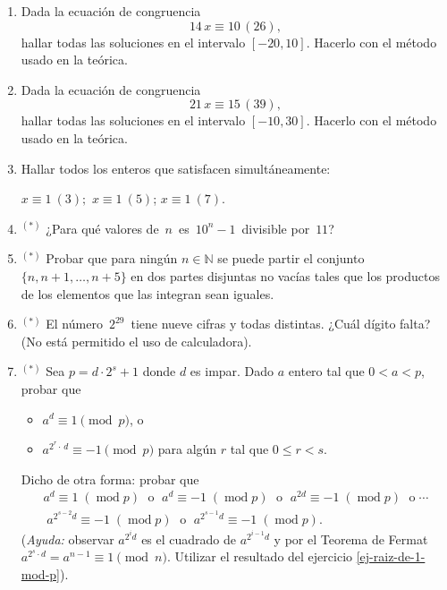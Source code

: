 \documentclass[a4paper,12pt,twoside,spanish,reqno]{amsbook}
\numberwithin{equation}{section}
\begin{document}
\begin{enumerate}[resume]
\item Dada la ecuación de congruencia
$$14\,x\equiv 10 \, (26),$$
hallar todas las soluciones en el intervalo $[-20,10]$. Hacerlo con el método usado en la teórica.

\item Dada la ecuación de congruencia
$$21\,x\equiv 15 \, (39),$$
hallar todas las soluciones en el intervalo $[-10,30]$. Hacerlo con el método usado en la teórica. 

\item Hallar todos los enteros que satisfacen simultáneamente:

$x \equiv 1\ ( 3); $ \qquad $x \equiv 1 \ ( 5)$; \qquad $x \equiv 1\ ( 7)$.

\item${}^{(*)}$  ¿Para qué valores de \,$n$\, es \,$10^n-1$\, divisible por \,$11$?

\item${}^{(*)}$ Probar que para ning\'un $n\in\mathbb N$ se puede partir el conjunto $\{n,n+1,\ldots, n+5\}$ en dos partes disjuntas no vacías tales que los productos de los elementos que las integran sean iguales.

\item${}^{(*)}$  El número \,$2^{29}$\, tiene nueve cifras y todas distintas.
¿Cuál dígito falta? (No está permitido el uso de calculadora).


\item${}^{(*)}$ Sea  $p = d \cdot 2^s + 1$ donde $d$ es impar. Dado $a$ entero tal que $0 < a <p$, probar que 
\begin{itemize}
    \item $a^{d} \equiv 1 \pmod{p}$, o
    \item $a^{2^r\cdot\, d} \equiv -1 \pmod{p}$  para algún $r$ tal que $0 \le r < s$.
\end{itemize} Dicho de otra forma: probar que
\begin{multline*}
    a^{d} \equiv 1 \;(\operatorname{mod} p) \;\text{ o }\; a^{d} \equiv -1 \;(\operatorname{mod} p) \;\text{ o }\;a^{2d} \equiv -1 \;(\operatorname{mod} p) \;\text{ o} \; \cdots\\ \; a^{2^{s-2}d} \equiv -1 \;(\operatorname{mod} p)\; \text{ o }\; a^{2^{s-1}d} \equiv -1 \;(\operatorname{mod} p).
\end{multline*}
(\textit{Ayuda:} observar $a^{2^{i}d}$ es el cuadrado de $a^{2^{i-1}d}$ y por el Teorema de Fermat $a^{2^s \cdot d} = a^{n-1} \equiv 1 \pmod{n}$. Utilizar el resultado del ejercicio \ref{ej-raiz-de-1-mod-p}).
\end{enumerate}
\end{document}
